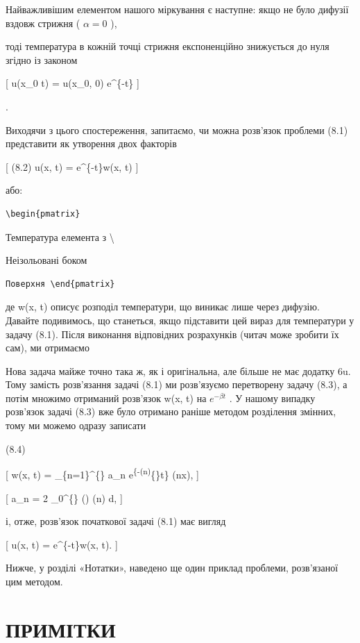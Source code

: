 \documentclass[
  ukrainian,
]{article}
\begin{document}
Найважливішим елементом нашого міркування є наступне: якщо не було
дифузії вздовж стрижня ( \(\alpha = 0\) ),

тоді температура в кожній точці стрижня експоненційно знижується до нуля
згідно із законом

{[} u(x\_0 t) = u(x\_0, 0) e\^{}\{-\beta t\} {]}

.

Виходячи з цього спостереження, запитаємо, чи можна розв'язок проблеми
(8.1) представити як утворення двох факторів

{[} (8.2) u(x, t) = e\^{}\{-\beta t\}w(x, t) {]}

або:

\begin{verbatim}
\begin{pmatrix}
\end{verbatim}

Температура елемента з \textbackslash{}

Неізольовані боком

\begin{verbatim}
Поверхня \end{pmatrix}
\end{verbatim}

де w(x, t) описує розподіл температури, що виникає лише через дифузію.
Давайте подивимось, що станеться, якщо підставити цей вираз для
температури у задачу (8.1). Після виконання відповідних розрахунків
(читач може зробити їх сам), ми отримаємо

Нова задача майже точно така ж, як і оригінальна, але більше не має
додатку 6u. Тому замість розв'язання задачі (8.1) ми розв'язуємо
перетворену задачу (8.3), а потім множимо отриманий розв'язок w(x, t) на
\(e^{-\beta t}\) . У нашому випадку розв'язок задачі (8.3) вже було
отримано раніше методом розділення змінних, тому ми можемо одразу
записати

(8.4)

{[} w(x, t) = \sum\_\{n=1\}\^{}\{\infty\} a\_n
e\textsuperscript{\{-(n\pi\alpha)}\{\}t\} \sin(n\pi x), {]}

{[} a\_n = 2 \int\_0\^{}\{\infty\} \phi(\xi) \sin(n\pi \xi) d\xi, {]}

і, отже, розв'язок початкової задачі (8.1) має вигляд

{[} u(x, t) = e\^{}\{-\beta t\}w(x, t). {]}

Нижче, у розділі «Нотатки», наведено ще один приклад проблеми,
розв'язаної цим методом.

\section{ПРИМІТКИ}\label{ux43fux440ux438ux43cux456ux442ux43aux438-1}
\end{document}
